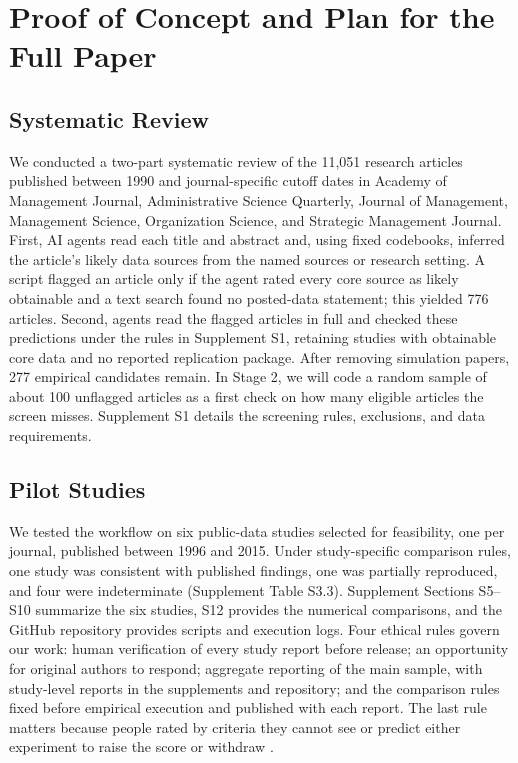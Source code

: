 \documentclass[12pt]{article}
\begin{document}
\section{Proof of Concept and Plan for the Full Paper}\label{sec:poc}

\subsection{Systematic Review}

We conducted a two-part systematic review of the 11,051 research articles published between 1990 and journal-specific cutoff dates in Academy of Management Journal, Administrative Science Quarterly, Journal of Management, Management Science, Organization Science, and Strategic Management Journal. First, AI agents read each title and abstract and, using fixed codebooks, inferred the article's likely data sources from the named sources or research setting. A script flagged an article only if the agent rated every core source as likely obtainable and a text search found no posted-data statement; this yielded 776 articles. Second, agents read the flagged articles in full and checked these predictions under the rules in Supplement S1, retaining studies with obtainable core data and no reported replication package. After removing simulation papers, 277 empirical candidates remain. In Stage 2, we will code a random sample of about 100 unflagged articles as a first check on how many eligible articles the screen misses. Supplement S1 details the screening rules, exclusions, and data requirements.

\subsection{Pilot Studies}

We tested the workflow on six public-data studies selected for feasibility, one per journal, published between 1996 and 2015. Under study-specific comparison rules, one study was consistent with published findings, one was partially reproduced, and four were indeterminate (Supplement Table S3.3). Supplement Sections S5--S10 summarize the six studies, S12 provides the numerical comparisons, and the GitHub repository provides scripts and execution logs. Four ethical rules govern our work: human verification of every study report before release;  an opportunity for original authors to respond; aggregate reporting of the main sample, with study-level reports in the supplements and repository; and the comparison rules fixed before empirical execution and published with each report. The last rule matters because people rated by criteria they cannot see or predict either experiment to raise the score or withdraw \citep{rahman2021}.
\end{document}
